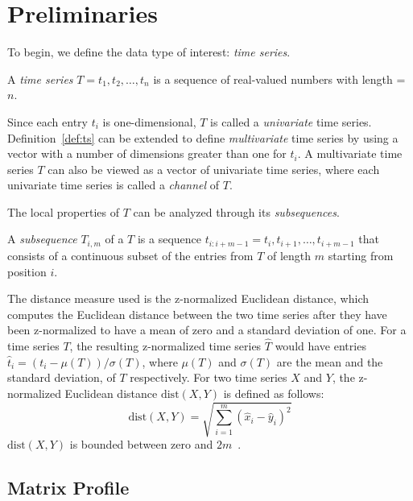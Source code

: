 \section{Preliminaries} \label{sec:preliminaries}

To begin, we define the data type of interest: \textit{time series}.
\begin{definition}
    \label{def:ts}
    A \textit{time series} $T = t_1, t_2, \dots, t_n$ is a sequence of real-valued numbers with length = $n$.
\end{definition}
Since each entry $t_i$ is one-dimensional, $T$ is called a \textit{univariate} time series.
Definition~\ref{def:ts} can be extended to define \textit{multivariate} time series by using a vector with a number of dimensions greater than one for $t_i$.
A multivariate time series $T$ can also be viewed as a vector of univariate time series, where each univariate time series is called a \textit{channel} of $T$.

The local properties of $T$ can be analyzed through its \textit{subsequences}.
\begin{definition}[Subsequence]
    A \textit{subsequence} $T_{i, m}$ of a $T$ is a sequence $t_{i:i+m-1} = t_i, t_{i+1}, \dots, t_{i+m-1}$ that consists of a continuous subset of the entries from $T$ of length $m$ starting from position $i$.
\end{definition}

The distance measure used is the z-normalized Euclidean distance, which computes the Euclidean distance between the two time series after they have been z-normalized to have a mean of zero and a standard deviation of one.
For a time series $T$, the resulting z-normalized time series $\hat{T}$ would have entries $\hat{t}_i = (t_i - \mu(T))/\sigma(T)$, where $\mu(T)$ and $\sigma(T)$ are the mean and the standard deviation, of $T$ respectively.
For two time series $X$ and $Y$, the z-normalized Euclidean distance $\mathrm{dist}(X, Y)$ is defined as follows:
\begin{equation} 
    \label{eq:ed}
    \mathrm{dist}(X, Y) = \sqrt{\sum_{i=1}^m(\hat{x}_i - \hat{y}_i)^2}
\end{equation}
$\mathrm{dist}(X, Y)$ is bounded between zero and $2m$~\cite{mueen2010online}.

\subsection{Matrix Profile}

